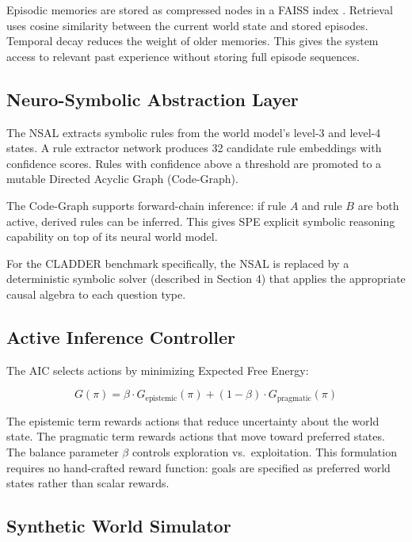 \documentclass{article}
\begin{document}
Episodic memories are stored as compressed nodes in a FAISS index
\cite{johnson2019faiss}. Retrieval uses cosine similarity between
the current world state and stored episodes. Temporal decay reduces
the weight of older memories. This gives the system access to relevant
past experience without storing full episode sequences.

\subsection{Neuro-Symbolic Abstraction Layer}

The NSAL extracts symbolic rules from the world model's level-3 and
level-4 states. A rule extractor network produces 32 candidate rule
embeddings with confidence scores. Rules with confidence above a
threshold are promoted to a mutable Directed Acyclic Graph (Code-Graph).

The Code-Graph supports forward-chain inference: if rule $A$ and rule $B$
are both active, derived rules can be inferred. This gives SPE explicit
symbolic reasoning capability on top of its neural world model.

For the CLADDER benchmark specifically, the NSAL is replaced by a
deterministic symbolic solver (described in Section 4) that applies
the appropriate causal algebra to each question type.

\subsection{Active Inference Controller}

The AIC selects actions by minimizing Expected Free Energy:

\begin{equation}
G(\pi) = \beta \cdot G_{\text{epistemic}}(\pi) + (1-\beta) \cdot G_{\text{pragmatic}}(\pi)
\end{equation}

The epistemic term rewards actions that reduce uncertainty about the world
state. The pragmatic term rewards actions that move toward preferred states.
The balance parameter $\beta$ controls exploration vs.\ exploitation. This
formulation requires no hand-crafted reward function: goals are specified
as preferred world states rather than scalar rewards.

\subsection{Synthetic World Simulator}
\end{document}
